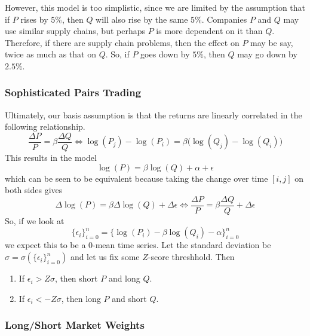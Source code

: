 \documentclass{article}
\begin{document}
      However, this model is too simplistic, since we are limited by the assumption that if $P$ rises by $5\%$, then $Q$ will also rise by the same $5\%$. Companies $P$ and $Q$ may use similar supply chains, but perhaps $P$ is more dependent on it than $Q$. Therefore, if there are supply chain problems, then the effect on $P$ may be say, twice as much as that on $Q$. So, if $P$ goes down by $5\%$, then $Q$ may go down by $2.5\%$. 

    \subsubsection{Sophisticated Pairs Trading}

      Ultimately, our basis assumption is that the returns are linearly correlated in the following relationship. 
      \[\frac{\Delta P}{P} = \beta \frac{\Delta Q}{Q} \iff \log(P_j) - \log(P_i) = \beta \big( \log(Q_j) - \log(Q_i) \big)\]
      This results in the model 
      \[\log(P) = \beta \log(Q) + \alpha + \epsilon\]
      which can be seen to be equivalent because taking the change over time $[i, j]$ on both sides gives 
      \[\Delta \log(P) = \beta \Delta \log(Q) + \Delta \epsilon \iff \frac{\Delta P}{P} = \beta \frac{\Delta Q}{Q} + \Delta\epsilon \]
      So, if we look at
      \[\{\epsilon_i\}_{i=0}^n = \{\log(P_i) - \beta \log(Q_i) - \alpha\}_{i=0}^n \]
      we expect this to be a $0$-mean time series. Let the standard deviation be $\sigma = \sigma(\{\epsilon_i\}_{i=0}^n)$ and let us fix some $Z$-score threshhold. Then 
      \begin{enumerate}
          \item If $\epsilon_i > Z \sigma$, then short $P$ and long $Q$. 
          \item If $\epsilon_i < -Z \sigma$, then long $P$ and short $Q$. 
      \end{enumerate}

    \subsubsection{Long/Short Market Weights}
\end{document}
